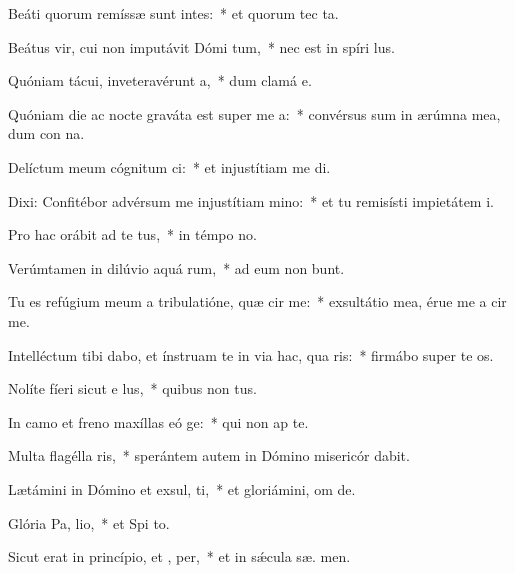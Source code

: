 \item Beáti quorum remíssæ sunt intes:~* et quorum tec  ta.
\item Beátus vir, cui non imputávit Dómi tum,~* nec est in spíri  lus.
\item Quóniam tácui, inveteravérunt  a,~* dum clamá  e.
\item Quóniam die ac nocte graváta est super me  a:~* convérsus sum in ærúmna mea, dum con na.
\item Delíctum meum cógnitum  ci:~* et injustítiam me  di.
\item Dixi: Confitébor advérsum me injustítiam  mino:~* et tu remisísti impietátem  i.
\item Pro hac orábit ad te  tus,~* in témpo no.
\item Verúmtamen in dilúvio aquá rum,~* ad eum non bunt.
\item Tu es refúgium meum a tribulatióne, quæ cir me:~* exsultátio mea, érue me a cir me.
\item Intelléctum tibi dabo, et ínstruam te in via hac, qua ris:~* firmábo super te  os.
\item Nolíte fíeri sicut e  lus,~* quibus non  tus.
\item In camo et freno maxíllas eó ge:~* qui non ap  te.
\item Multa flagélla ris,~* sperántem autem in Dómino misericór dabit.
\item Lætámini in Dómino et exsul, ti,~* et gloriámini, om  de.
\item Glória Pa,  lio,~* et Spi to.
\item Sicut erat in princípio, et ,  per,~* et in sǽcula sæ. men.
